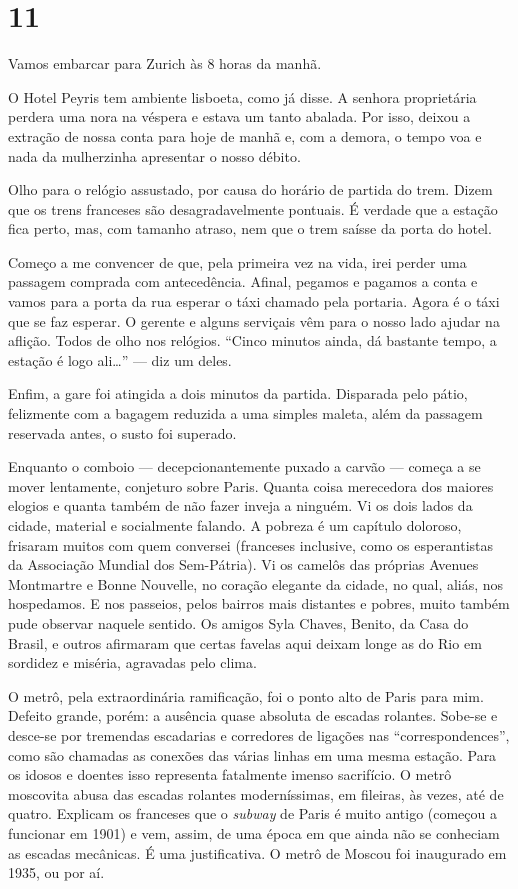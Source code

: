 \section*{11 \adfflatleafright {}}
Vamos embarcar para Zurich às 8 horas da manhã.

O Hotel Peyris tem ambiente lisboeta, como já disse. A senhora proprietária perdera uma nora na véspera e estava um tanto abalada. Por isso, deixou a extração de nossa conta para hoje de manhã e, com a demora, o tempo voa e nada da mulherzinha apresentar o nosso débito.

Olho para o relógio assustado, por causa do horário de partida do trem. Dizem que os trens franceses são desagradavelmente pontuais. É verdade que a estação fica perto, mas, com tamanho atraso, nem que o trem saísse da porta do hotel.

Começo a me convencer de que, pela primeira vez na vida, irei perder uma passagem comprada com antecedência. Afinal, pegamos e pagamos a conta e vamos para a porta da rua esperar o táxi chamado pela portaria. Agora é o táxi que se faz esperar. O gerente e alguns serviçais vêm para o nosso lado ajudar na aflição. Todos de olho nos relógios. ``Cinco minutos ainda, dá bastante tempo, a estação é logo ali\ldots'' --- diz um deles.

Enfim, a gare foi atingida a dois minutos da partida. Disparada pelo pátio, felizmente com a bagagem reduzida a uma simples maleta, além da passagem reservada antes, o susto foi superado.

Enquanto o comboio --- decepcionantemente puxado a carvão --- começa a se mover lentamente, conjeturo sobre Paris. Quanta coisa merecedora dos maiores elogios e quanta também de não fazer inveja a ninguém. Vi os dois lados da cidade, material e socialmente falando. A pobreza é um capítulo doloroso, frisaram muitos com quem conversei (franceses inclusive, como os esperantistas da Associação Mundial dos Sem-Pátria). Vi os camelôs das próprias Avenues Montmartre e Bonne Nouvelle, no coração elegante da cidade, no qual, aliás, nos hospedamos. E nos passeios, pelos bairros mais distantes e pobres, muito também pude observar naquele sentido. Os amigos Syla Chaves, Benito, da Casa do Brasil, e outros afirmaram que certas favelas aqui deixam longe as do Rio em sordidez e miséria, agravadas pelo clima.

O metrô, pela extraordinária ramificação, foi o ponto alto de Paris para mim. Defeito grande, porém: a ausência quase absoluta de escadas rolantes. Sobe-se e desce-se por tremendas escadarias e corredores de ligações nas ``correspondences'', como são chamadas as conexões das várias linhas em uma mesma estação. Para os idosos e doentes isso representa fatalmente imenso sacrifício. O metrô moscovita abusa das escadas rolantes moderníssimas, em fileiras, às vezes, até de quatro. Explicam os franceses que o \textit{subway} de Paris é muito antigo (começou a funcionar em 1901) e vem, assim, de uma época em que ainda não se conheciam as escadas mecânicas. É uma justificativa. O metrô de Moscou foi inaugurado em 1935, ou por aí.

